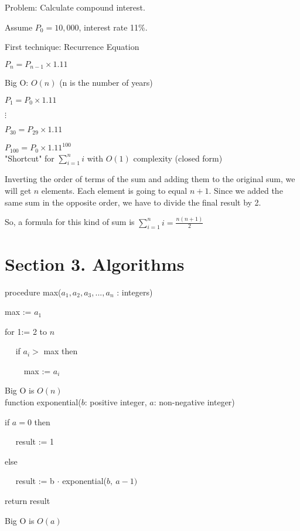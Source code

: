 \documentclass{exam}
\begin{document}
	
	Problem: Calculate compound interest.
    
    Assume $P_0 = 10,000$, interest rate 11\%.
    
    First technique: Recurrence Equation
    
    $P_n = P_{n-1} \times 1.11$
    
    Big O: $O(n)$ (n is the number of years)
    
    $P_1 = P_0 \times 1.11$
    
    $\vdots$
    
    $P_{30} = P_{29} \times 1.11$
    
    $P_{100} = P_0 \times 1.11^{100}$\\
    
    "Shortcut" for $\sum_{i=1}^{n} i$ with $O(1)$ complexity (closed form)
    
    Inverting the order of terms of the sum and adding them to the original sum, we will get $n$ elements. Each element is going to equal $n+1$. Since we added the same sum in the opposite order, we have to divide the final result by 2.
    
    So, a formula for this kind of sum is  $\sum_{i=1}^{n} i = \frac{n(n+1)}{2}$
    
    \section{Section 3. Algorithms}
    
    procedure max($a_1, a_2, a_3, ..., a_n$ : integers)
    
    max := $a_1$
    
    for 1:= 2 to $n$
    
    $\quad$ if $a_i > $ max then
    
         $\quad\quad$ max := $a_i$
         
    Big O is $O(n)$\\
    
    \noindent     
    function exponential($b$: positive integer, $a$: non-negative integer)
    
    if $a = 0$ then 
    
    $\quad$ result := 1
    
    else
    
    $\quad$ result := b $\cdot$ exponential($b,\ a-1)$
    
    return result
    
    Big O is $O(a)$\\
    
\end{document}
